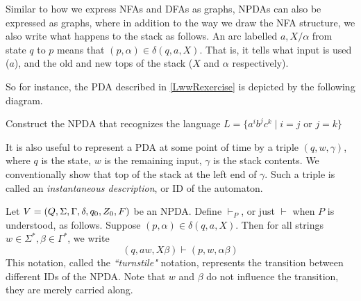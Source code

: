 \vspace{3mm}
Similar to how we express NFAs and DFAs as graphs, NPDAs can also be expressed as graphs, where in addition to the way we draw the NFA structure, we also write what happens to the stack as follows. An arc labelled $a,X/\alpha$ from state $q$ to $p$ means that $(p,\alpha)\in\delta(q,a,X)$. That is, it tells what input is used ($a$), and the old and new tops of the stack ($X$ and $\alpha$ respectively).

\vspace{3mm}
So for instance, the PDA described in \ref{LwwRexercise} is depicted by the following diagram.

\begin{center}
\end{center}

\begin{exercise}
Construct the NPDA that recognizes the language $L=\{a^ib^jc^k\mid i=j\text{ or }j=k\}$
\end{exercise}

It is also useful to represent a PDA at some point of time by a triple $(q,w,\gamma)$, where $q$ is the state, $w$ is the remaining input, $\gamma$ is the stack contents. We conventionally show that top of the stack at the left end of $\gamma$. Such a triple is called an \textit{instantaneous description}, or ID of the automaton.

\vspace{3mm}
Let $V=(Q,\Sigma,\Gamma,\delta,q_0,Z_0,F)$ be an NPDA. Define $\vdash_P$, or just $\vdash$ when $P$ is understood, as follows. Suppose $(p,\alpha)\in\delta(q,a,X)$. Then for all strings $w\in\Sigma^*,\beta\in\Gamma^*$, we write
$$(q,aw,X\beta)\vdash(p,w,\alpha\beta)$$
This notation, called the \textit{``turnstile"} notation, represents the transition between different IDs of the NPDA. Note that $w$ and $\beta$ do not influence the transition, they are merely carried along.


